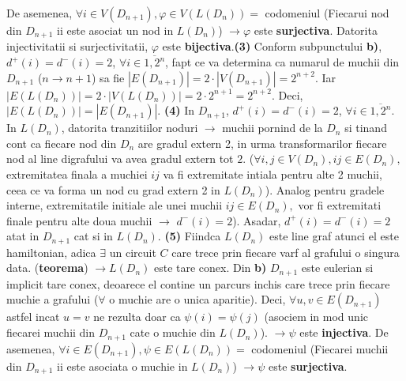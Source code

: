 \documentclass{article}
\begin{document}
De asemenea, $\forall i\in V(D_{n+1}), \varphi \in V(L(D_n))=$ codomeniul (Fiecarui nod din $D_{n+1}$ ii este asociat un nod in $L(D_n)$) $\rightarrow \varphi$ este \textbf{surjectiva}.
\newline
Datorita injectivitatii si surjectivitatii, $\varphi$ este \textbf{bijectiva}.\textbf{(3)}
\newline
\newline
Conform subpunctului \textbf{b)}, $d^+(i)=d^-(i)=2$, $\forall i \in \overline{1,2^n}$, fapt ce va determina ca numarul de muchii din $D_{n+1}$ ($n \rightarrow n+1$) sa fie $|E(D_{n+1})|=2 \cdot |V(D_{n+1})|= 2^{n+2}$. Iar $|E(L(D_n))|= 2 \cdot |V(L(D_n))|= 2 \cdot 2^{n+1}= 2^{n+2}$. Deci, $|E(L(D_n))|=|E(D_{n+1})|$. 
\textbf{(4)}
\newline
\newline
In $D_{n+1}$, $d^+(i)=d^-(i)=2$, $\forall i \in \overline{1,2^n}$. In $L(D_n)$, datorita tranzitiilor noduri $\rightarrow$ muchii pornind de la $D_n$ si tinand cont ca fiecare nod din $D_n$ are gradul extern 2, in urma transformarilor fiecare nod al line digrafului va avea gradul extern tot $2$. ($\forall i,j \in V(D_n), ij \in E(D_n),$ extremitatea finala a muchiei $ij$ va fi extremitate intiala pentru alte 2 muchii, ceea ce va forma un nod cu grad extern 2 in $L(D_n)$). 
\newline
Analog pentru gradele interne, extremitatile initiale ale unei muchii $ij \in E(D_n),$ vor fi extremitati finale pentru alte doua muchii $\rightarrow$  $d^-(i)=2$). Asadar, $d^+(i)=d^-(i)=2$ atat in $D_{n+1}$ cat si in $L(D_n)$. \textbf{(5)}
\newline
\newline
Fiindca $L(D_n)$ este line graf atunci el este hamiltonian, adica $\exists$ un circuit $C$ care trece prin fiecare varf al grafului o singura data. (\textbf{teorema}) $\rightarrow L(D_n)$ este tare conex.
\newline
\newline
Din \textbf{b)} $D_{n+1}$ este eulerian si implicit tare conex, deoarece el contine un parcurs inchis care trece prin fiecare muchie a grafului ($\forall$ o muchie are o unica aparitie).
\newline
Deci, $\forall u,v \in E(D_{n+1})$ astfel incat $u=v$ ne rezulta doar ca $\psi(i)=\psi(j)$ (asociem in mod unic fiecarei muchii din $D_{n+1}$ cate o muchie din $L(D_n)$). $\rightarrow \psi$ este \textbf{injectiva}.
De asemenea, $\forall i\in E(D_{n+1}), \psi \in E(L(D_n))=$ codomeniul (Fiecarei muchii din $D_{n+1}$ ii este asociata o muchie in $L(D_n)$) $\rightarrow \psi$ este \textbf{surjectiva}.
\end{document}
